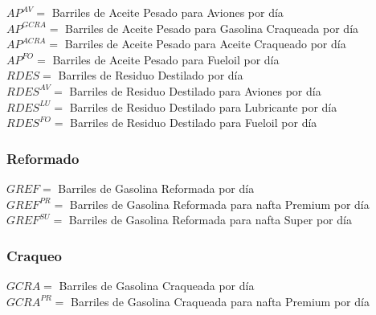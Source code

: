 \documentclass[a4paper,10pt]{article}
\begin{document}
$AP^{AV} = $ Barriles de Aceite Pesado para Aviones por d\'ia \\

$AP^{GCRA} = $ Barriles de Aceite Pesado para Gasolina Craqueada  por d\'ia \\

$AP^{ACRA} = $ Barriles de Aceite Pesado para Aceite Craqueado por d\'ia \\

$AP^{FO} = $ Barriles de Aceite Pesado para Fueloil por d\'ia \\

$RDES = $ Barriles de Residuo Destilado por d\'ia \\

$RDES^{AV} = $ Barriles de Residuo Destilado para Aviones por d\'ia \\

$RDES^{LU} = $ Barriles de Residuo Destilado para Lubricante por d\'ia \\

$RDES^{FO} = $ Barriles de Residuo Destilado para Fueloil por d\'ia \\
\vspace{2mm}

\subsubsection{Reformado}
\vspace{5mm}

$GREF = $ Barriles de Gasolina Reformada por d\'ia \\

$GREF^{PR} = $ Barriles de Gasolina Reformada para nafta Premium por d\'ia \\

$GREF^{SU} = $ Barriles de Gasolina Reformada para nafta Super por d\'ia \\
\vspace{2mm}

\subsubsection{Craqueo}
\vspace{5mm}

$GCRA = $ Barriles de Gasolina Craqueada por d\'ia \\

$GCRA^{PR} = $ Barriles de Gasolina Craqueada para nafta Premium por d\'ia \\
\end{document}
